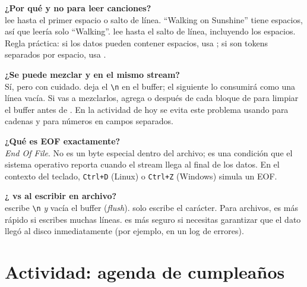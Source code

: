 \documentclass[12pt, oneside]{article}
\begin{document}
\begin{notaprofesor}

  \textbf{¿Por qué  y no \cpp{>>} para leer canciones?}\\
  \cpp{>>} lee hasta el primer espacio o salto de línea.  ``Walking on
  Sunshine'' tiene espacios, así que \cpp{>>} leería solo ``Walking''.
   lee hasta el salto de línea, incluyendo los espacios.
  Regla práctica: si los datos pueden contener espacios, usa ;
  si son tokens separados por espacio, usa \cpp{>>}.

  \medskip
  \textbf{¿Se puede mezclar  y \cpp{>>} en el mismo stream?}\\
  Sí, pero con cuidado.  \cpp{>>} deja el \texttt{\textbackslash n} en el buffer;
  el siguiente  lo consumirá como una línea vacía.  Si vas a
  mezclarlos, agrega  o 
  después de cada bloque de \cpp{>>} para limpiar el buffer antes de
  .  En la actividad de hoy se evita este problema usando
   para cadenas y \cpp{>>} para números en campos separados.

  \medskip
  \textbf{¿Qué es EOF exactamente?}\\
  \textit{End Of File}.  No es un byte especial dentro del archivo; es
  una condición que el sistema operativo reporta cuando el stream llega
  al final de los datos.  En el contexto del teclado, \texttt{Ctrl+D}
  (Linux) o \texttt{Ctrl+Z} (Windows) simula un EOF.

  \medskip
  \textbf{¿ vs  al escribir en archivo?}\\
   escribe \texttt{\textbackslash n} \textit{y} vacía el buffer
  (\textit{flush}).   solo escribe el carácter.  Para
  archivos,  es más rápido si escribes muchas líneas.
   es más seguro si necesitas garantizar que el dato llegó al
  disco inmediatamente (por ejemplo, en un log de errores).

\end{notaprofesor}

\section{Actividad: agenda de cumpleaños}
\end{document}
